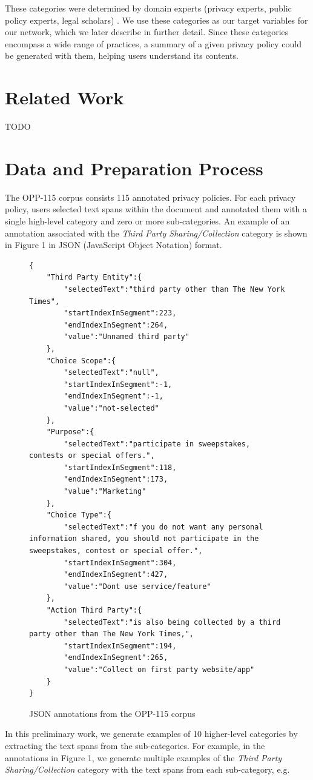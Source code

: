 \documentclass[12pt, letterpaper]{article}
\begin{document}
These categories were determined by domain experts (privacy experts, public policy experts, legal scholars) \cite{wilson2016creation}. We use these categories as our target variables for our network, which we later describe in further detail. Since these categories encompass a wide range of practices, a summary of a given privacy policy could be generated with them, helping users understand its contents.

\section{Related Work}
TODO

\section{Data and Preparation Process}
The OPP-115 corpus consists 115 annotated privacy policies. For each privacy policy, users selected text spans within the document and annotated them with a single high-level category and zero or more sub-categories. An example of an annotation associated with the \textit{Third Party Sharing/Collection} category is shown in Figure 1 in JSON (JavaScript Object Notation) format.

\begin{figure}[]
\begin{lstlisting}
{
	"Third Party Entity":{
		"selectedText":"third party other than The New York Times",
		"startIndexInSegment":223,
		"endIndexInSegment":264,
		"value":"Unnamed third party"
	},
	"Choice Scope":{
		"selectedText":"null",
		"startIndexInSegment":-1,
		"endIndexInSegment":-1,
		"value":"not-selected"
	},
	"Purpose":{
		"selectedText":"participate in sweepstakes, contests or special offers.",
		"startIndexInSegment":118,
		"endIndexInSegment":173,
		"value":"Marketing"
	},
	"Choice Type":{
		"selectedText":"f you do not want any personal information shared, you should not participate in the sweepstakes, contest or special offer.",
		"startIndexInSegment":304,
		"endIndexInSegment":427,
		"value":"Dont use service/feature"
	},
	"Action Third Party":{
		"selectedText":"is also being collected by a third party other than The New York Times,",
		"startIndexInSegment":194,
		"endIndexInSegment":265,
		"value":"Collect on first party website/app"
	}
}
\end{lstlisting}
\caption{JSON annotations from the OPP-115 corpus}
\end{figure}

In this preliminary work, we generate examples of 10 higher-level categories by extracting the text spans from the sub-categories. For example, in the annotations in Figure 1, we generate multiple examples of the \textit{Third Party Sharing/Collection} category with the text spans from each sub-category, e.g.
\end{document}
